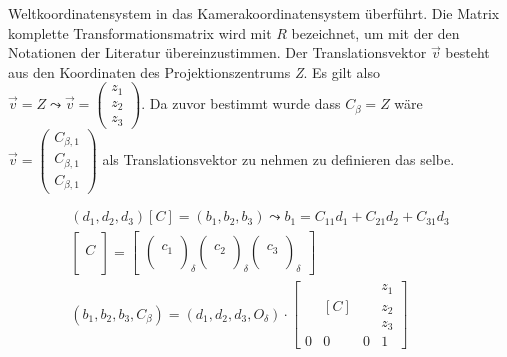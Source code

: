 Weltkoordinatensystem in das Kamerakoordinatensystem überführt. Die Matrix komplette Transformationsmatrix wird mit $R$ bezeichnet, um mit der den Notationen der Literatur übereinzustimmen\cite{Elements,HZ,Zhang2014}.
Der Translationsvektor \ensuremath{\vec{v}} besteht aus den Koordinaten des Projektionszentrums \textit{Z}. Es gilt also $\vec{v} = Z \leadsto \vec{v} = \begin{pmatrix}	z_1\\z_2\\z_3\end{pmatrix}$. Da zuvor bestimmt wurde dass $C_\beta = Z$ wäre $\vec{v} = \begin{pmatrix}C_{\beta,1}\\C_{\beta,1}\\C_{\beta,1}\end{pmatrix}$ als Translationsvektor zu nehmen zu definieren das selbe.

 
\begin{gather} 		
(d_1,d_2,d_3)[C] =(b_1, b_2, b_3) \leadsto b_1 = C_{11}d_1 + C_{21}d_2 + C_{31}d_3\\	
\begin{bmatrix}
\\C\\\\
\end{bmatrix}
=	\begin{bmatrix}
\begin{pmatrix}
\\
c_1\\
\\
\end{pmatrix}_\delta
\begin{pmatrix}
\\
c_2\\
\\
\end{pmatrix}_\delta
\begin{pmatrix}
\\
c_3\\
\\
\end{pmatrix}_\delta
\end{bmatrix}\\
(b_1, b_2, b_3,C_\beta)=(d_1,d_2,d_3,O_\delta) \cdot
\begin{bmatrix}
&  &  &z_1 \\
&  [C]&  &z_2 \\ 
&  &  &z_3 \\
0&0&0 & 1
\end{bmatrix}	
\end{gather}

